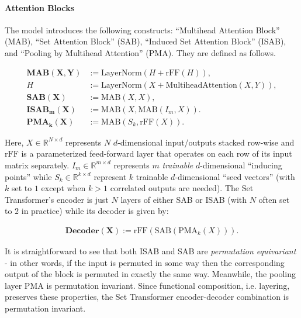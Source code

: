 \paragraph{Attention Blocks} The model introduces the following constructs: ``Multihead Attention Block'' (MAB), ``Set Attention Block'' (SAB), ``Induced Set Attention Block'' (ISAB), and ``Pooling by Multihead Attention'' (PMA). They are defined as follows.

\begin{align*}
\mathbf{\textbf{MAB}(X, Y)} &:= \text{LayerNorm}\left(H + \text{rFF}(H)\right),\\
H &:= \text{LayerNorm}\left(X + \text{MultiheadAttention}(X, Y)\right),\\
\mathbf{\textbf{SAB}(X)} &:= \text{MAB}(X, X),\\
\mathbf{\textbf{ISAB}_m(X)} &:= \text{MAB}\left(X, \text{MAB}(I_m, X)\right).\\
\mathbf{\textbf{PMA}_k(X)} &:= \text{MAB}\left(S_k, \text{rFF}(X)\right).
\end{align*}

Here, $X \in \mathbb{R}^{N \times d}$ represents $N$ $d$-dimensional input/outputs stacked row-wise and $\text{rFF}$ is a parameterized feed-forward layer that operates on each row of its input matrix separately. $I_m \in \mathbb{R}^{m \times d}$ represents $m$ \emph{trainable} $d$-dimensional ``inducing points'' while $S_k \in \mathbb{R}^{k \times d}$ represent $k$ trainable $d$-dimensional ``seed vectors'' (with $k$ set to $1$ except when $k > 1$ correlated outputs are needed). The Set Transformer's encoder is just $N$ layers of either SAB or ISAB (with $N$ often set to $2$ in practice) while its decoder is given by:

\begin{align*}
\mathbf{\textbf{Decoder}(X)} := \text{rFF}\left(\text{SAB}\left(\text{PMA}_k(X)\right)\right).
\end{align*}

It is straightforward to see that both ISAB and SAB are \emph{permutation equivariant} - in other words, if the input is permuted in some way then the corresponding output of the block is permuted in exactly the same way. Meanwhile, the pooling layer PMA is permutation invariant. Since functional composition, i.e. layering, preserves these properties, the Set Transformer encoder-decoder combination is permutation invariant.
